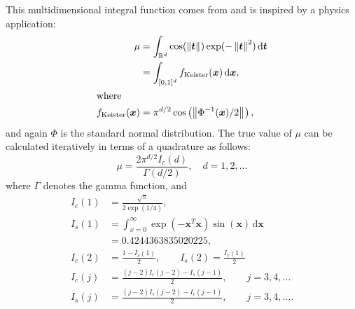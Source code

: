 \documentclass{iitthesis}          %
\newcommand{\bm}[1]{\boldsymbol{#1}}
\newcommand{\dif}[1]{\text{d}{#1}}
\newcommand{\reals}{\mathbb{R}}
\newcommand{\vt}{\bm{t}}
\newcommand{\vx}{\bm{x}}
\newcommand{\dvx}{\dif{\bm{x}}}
\newcommand{\dvt}{\dif{\bm{t}}}
\newcommand{\norm}[2][{}]{\ensuremath{\left \lVert #2 \right \rVert}_{#1}}
\begin{document}
\label{sec:cubBayesLattice_keister_example}
This multidimensional integral function comes from \cite{Kei96} and is inspired by a physics application:
\begin{align}
\label{eqn:keister_integral}
\mu & =  \int_{\reals^d} \cos(\norm{ \vt}) \exp(-\norm{ \vt }^2) \, \dvt \\
\nonumber
& = \int_{[0,1]^d} f_{\textup{Keister}}(\vx) \, \dvx,\\
\intertext{where }
f_\textup{Keister}(\vx) &= \pi^{d/2} \cos\left(\norm{ \Phi^{-1}(\vx)/2}\right)  ,
\end{align}
and again $\Phi$ is the standard normal distribution.
The true value of $\mu$ can be calculated iteratively in terms of a quadrature as follows:  
\begin{equation*}
\mu = \frac{2 \pi^{d/2} I_c(d)}{\Gamma(d/2)}, \quad d=1,2, \ldots
\end{equation*}
where $\Gamma$ denotes the gamma function, and
\begin{align*}
I_c(1) &= \frac{\sqrt{\pi}}{2 \exp(1/4)}, 
\\
I_s(1) &= \int_{x=0}^\infty \exp(-\vx^T\vx)\sin(\vx) \, \dvx 
\\
& =  0.4244363835020225,
\\
I_c(2) &= \frac{1-I_s(1)}{2}, \qquad
I_s(2) = \frac{I_c(1)}{2}
\\
I_c(j) &= \frac{(j-2)I_c(j-2)-I_s(j-1)}{2},
\qquad j =3,4,\ldots
\\
I_s(j) &= \frac{(j-2)I_s(j-2)-I_c(j-1)}{2},
\qquad j =3,4,\ldots.
\end{align*}
\end{document}
